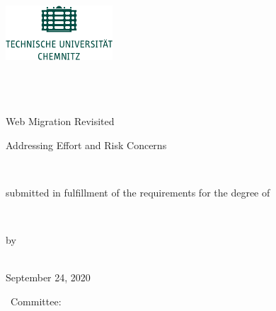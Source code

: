 

\begin{titlepage}
	\myfont
	\centering
	
	\includegraphics[width=4cm]{figures/tuc-logo}\\
	\hrulefill\\[1em]
	{\normalsize \thesisUniversityDepartment}\\[0.0em]
	{\normalsize \thesisUniversityGroup}\\[7mm]
	
	\vfill
	
	\begin{spacing}{0.5}
		{\Large Web Migration Revisited}\\[5mm]
	\end{spacing}
	\begin{spacing}{1.0}
			{\large Addressing Effort and Risk Concerns}\\[7mm]
	\end{spacing}
	
	\vfill
	
	{\large \thesisSubject}\\[1mm]
	\begin{minipage}[t]{.4\textwidth}
		\begin{center}
			{\footnotesize submitted in fulfillment of the requirements for the degree of}
		\end{center}
	\end{minipage}\\[1mm]
	{\large \thesisDegree}
	
	\vfill
	
	{\small by}\\[1mm]
	{\large \thesisAuthorName}\\
	
	\vfill
	
	September 24, 2020
	
	\vfill
	{\small \thesisSubject~Committee:}\\[1mm]
	{\normalsize \thesisFirstReviewer} \\
	{\normalsize \thesisSecondReviewer} \\
	{\normalsize \thesisThirdReviewer}
\end{titlepage}


